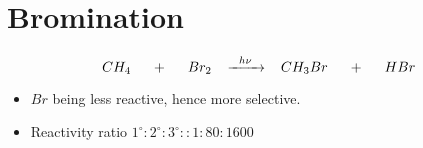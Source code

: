\documentclass{article}
\begin{document}
\section{Bromination}
$$CH_{4} \hspace{5mm} + \hspace{5mm} Br_{2} \hspace{3mm} \xrightarrow{\hspace{2mm} h\nu \hspace{2mm}} \hspace{3mm} CH_{3}Br \hspace{5mm} + \hspace{5mm} HBr$$

\begin{itemize}
    \item $Br$ being less reactive, hence more selective.
    \item Reactivity ratio $1^\circ : 2^\circ : 3^\circ :: 1:80:1600$
\end{itemize}
\end{document}
